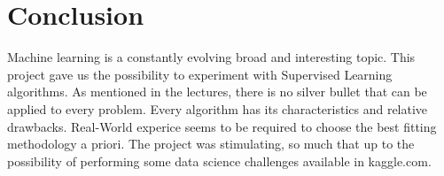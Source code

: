 \documentclass{article}
\begin{document}
\section{Conclusion}
Machine learning is a constantly evolving broad and interesting topic.
\break This project gave us the possibility to experiment with Supervised Learning algorithms.
As mentioned in the lectures, there is no silver bullet that can be applied to every problem. Every algorithm has its characteristics and relative drawbacks. Real-World experice seems to be required to choose the best fitting methodology a priori.
The project was stimulating, so much that up to the possibility of performing some data science challenges available in kaggle.com.
\end{document}
